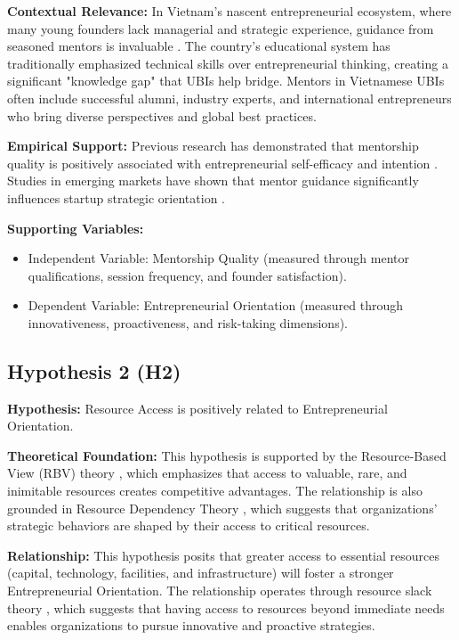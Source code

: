 \documentclass[../Main.tex]{subfiles}
\begin{document}
    \textbf{Contextual Relevance:} In Vietnam's nascent entrepreneurial ecosystem, where many young founders lack managerial and strategic experience, guidance from seasoned mentors is invaluable \cite{dinh2017promoting}. The country's educational system has traditionally emphasized technical skills over entrepreneurial thinking, creating a significant "knowledge gap" that UBIs help bridge. Mentors in Vietnamese UBIs often include successful alumni, industry experts, and international entrepreneurs who bring diverse perspectives and global best practices.
    
    \textbf{Empirical Support:} Previous research has demonstrated that mentorship quality is positively associated with entrepreneurial self-efficacy and intention \cite{bandura1997self, zhao2005developing}. Studies in emerging markets have shown that mentor guidance significantly influences startup strategic orientation \cite{sullivan2011effectiveness}.
    
    \textbf{Supporting Variables:}
    \begin{itemize}
        \item Independent Variable: Mentorship Quality (measured through mentor qualifications, session frequency, and founder satisfaction).
        \item Dependent Variable: Entrepreneurial Orientation (measured through innovativeness, proactiveness, and risk-taking dimensions).
    \end{itemize}

    \subsection{Hypothesis 2 (H2)}
    \textbf{Hypothesis:} Resource Access is positively related to Entrepreneurial Orientation.
    
    \textbf{Theoretical Foundation:} This hypothesis is supported by the Resource-Based View (RBV) theory \cite{barney1991firm}, which emphasizes that access to valuable, rare, and inimitable resources creates competitive advantages. The relationship is also grounded in Resource Dependency Theory \cite{pfeffer1978external}, which suggests that organizations' strategic behaviors are shaped by their access to critical resources.
    
    \textbf{Relationship:} This hypothesis posits that greater access to essential resources (capital, technology, facilities, and infrastructure) will foster a stronger Entrepreneurial Orientation. The relationship operates through resource slack theory \cite{cyert1963behavioral}, which suggests that having access to resources beyond immediate needs enables organizations to pursue innovative and proactive strategies.
    
\end{document}

